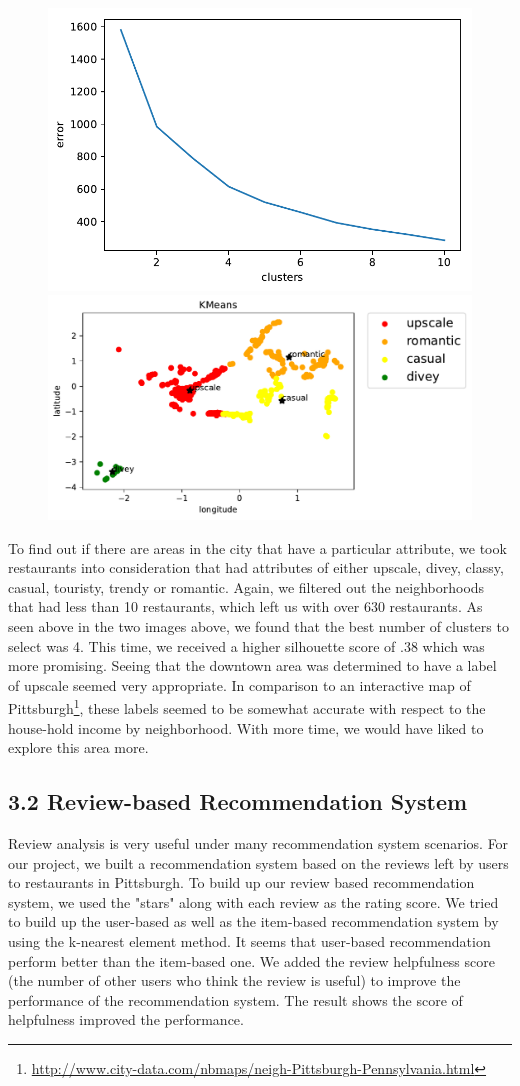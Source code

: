 \documentclass{neu_handout}
\begin{document}
\begin{figure}[h]
\centering
{
\includegraphics[width=0.38\linewidth]{error_kmeans_attributes}
}
{
\includegraphics[width=0.5\linewidth]{kmeans_attributes}
}
\end{figure}


To find out if there are areas in the city that have a particular attribute, we took restaurants into consideration that had attributes of either upscale, divey, classy, casual, touristy, trendy or romantic. Again, we filtered out the neighborhoods that had less than 10 restaurants, which left us with over 630 restaurants. As seen above in the two images above, we found that the best number of clusters to select was 4. This time, we received a higher silhouette score of .38 which was more promising. Seeing that the downtown area was determined to have a label of upscale seemed very appropriate. In comparison to an interactive map of Pittsburgh\footnote{\url{http://www.city-data.com/nbmaps/neigh-Pittsburgh-Pennsylvania.html}}, these labels seemed to be somewhat accurate with respect to the house-hold income by neighborhood. With more time, we would have liked to explore this area more.


\subsection*{3.2 Review-based Recommendation System}
Review analysis is very useful under many recommendation system scenarios. For our project, we built a recommendation system based on the reviews left by users to restaurants in Pittsburgh. To build up our review based recommendation system, we used the "stars" along with each review as the rating score. We tried to build up the user-based as well as the item-based recommendation system by using the k-nearest element method. It seems that user-based recommendation perform better than the item-based one. We added the review helpfulness score (the number of other users who think the review is useful) to improve the performance of the recommendation system. The result shows the score of helpfulness improved the performance.   
\end{document}

